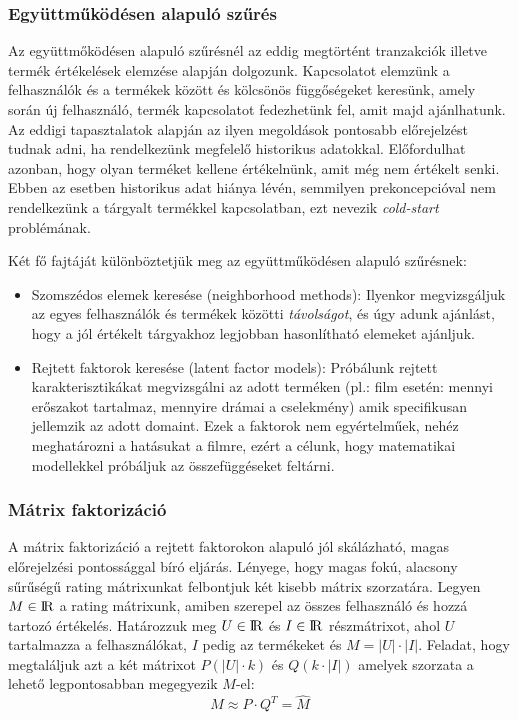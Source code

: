 \documentclass[a4paper,12pt]{article}
\begin{document}
\subsubsection{Együttműködésen alapuló szűrés}

Az együttmőködésen alapuló szűrésnél az eddig megtörtént tranzakciók illetve termék értékelések elemzése alapján dolgozunk\parencite{korenmf}. Kapcsolatot elemzünk a felhasználók és a termékek között és kölcsönös függőségeket keresünk, amely során új felhasználó, termék kapcsolatot fedezhetünk fel, amit majd ajánlhatunk. Az eddigi tapasztalatok alapján az ilyen megoldások pontosabb előrejelzést tudnak adni, ha rendelkezünk megfelelő historikus adatokkal. Előfordulhat azonban, hogy olyan terméket kellene értékelnünk, amit még nem értékelt senki. Ebben az esetben historikus adat hiánya lévén, semmilyen prekoncepcióval nem rendelkezünk a tárgyalt termékkel kapcsolatban, ezt nevezik \textsl{cold-start} problémának.\newline

Két fő fajtáját különböztetjük meg az együttműködésen alapuló szűrésnek:
\begin{itemize}
\item Szomszédos elemek keresése (neighborhood methods): Ilyenkor megvizsgáljuk az egyes felhasználók és termékek közötti \textsl{távolságot}, és úgy adunk ajánlást, hogy a jól értékelt tárgyakhoz legjobban hasonlítható elemeket ajánljuk.
\item Rejtett faktorok keresése (latent factor models): Próbálunk rejtett karakterisztikákat megvizsgálni az adott terméken (pl.: film esetén: mennyi erőszakot tartalmaz, mennyire drámai a cselekmény) amik specifikusan jellemzik az adott domaint. Ezek a faktorok nem egyértelműek, nehéz meghatározni a hatásukat a filmre, ezért a célunk, hogy matematikai modellekkel próbáljuk az összefüggéseket feltárni. 
\end{itemize}

\subsubsection{Mátrix faktorizáció}
A mátrix faktorizáció a rejtett faktorokon alapuló jól skálázható, magas előrejelzési pontossággal bíró eljárás. Lényege, hogy magas fokú, alacsony sűrűségű rating mátrixunkat felbontjuk két kisebb mátrix szorzatára. Legyen $M \in \rm I\!R$ a rating mátrixunk, amiben szerepel az összes felhasználó és hozzá tartozó értékelés. Határozzuk meg $U\in\rm I\!R$ és $I\in\rm I\!R$ részmátrixot, ahol $U$ tartalmazza a felhasználókat, $I$ pedig az termékeket és $M=|U| \cdot |I|$. Feladat, hogy megtaláljuk azt a két mátrixot $P(|U| \cdot k)$ és $Q(k \cdot |I|)$ amelyek szorzata a lehető legpontosabban megegyezik $M$-el:
\[M \approx P \cdot Q^T = \hat{M}\]
\end{document}

